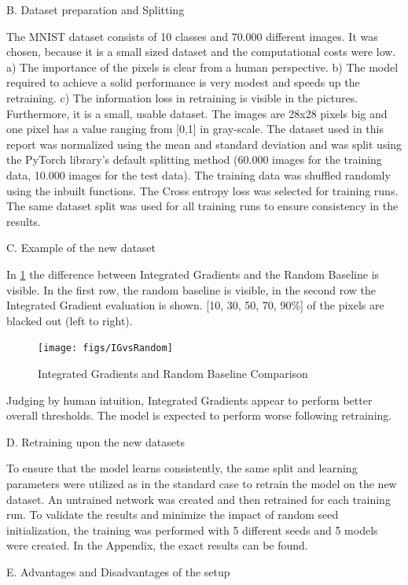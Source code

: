 B. Dataset preparation and Splitting

The MNIST dataset consists of 10 classes and 70.000 different images. It was chosen, because it is a small sized dataset and the computational costs were low. a) The importance of the pixels is clear from a human perspective. b) The model required to achieve a solid performance is very modest and speeds up the retraining. c) The information loss in retraining is visible in the pictures. Furthermore, it is a small, usable   dataset. The images are 28x28 pixels big and one pixel has a value ranging from [0,1] in gray-scale. The dataset used in this report was normalized using the mean and standard deviation and was split using the PyTorch library’s default splitting method (60.000 images for the training data, 10.000 images for the test data). The training data was shuffled randomly using the inbuilt functions. The Cross entropy loss was selected for training runs. The same dataset split was used for all training runs to ensure consistency in the results.

C. Example of the new dataset

In \ref{fig:IGvsRandom} the difference between Integrated Gradients and the Random Baseline is visible. In the first row, the random baseline is visible, in the second row the Integrated Gradient evaluation is shown. [10, 30, 50, 70, 90\%] of the pixels are blacked out (left to right).

\begin{figure}[h!]
	\centering
	\texttt{[image: figs/IGvsRandom]}
	\caption{Integrated Gradients and Random Baseline Comparison}
	\label{fig:IGvsRandom}
\end{figure}

Judging by human intuition, Integrated Gradients appear to perform better overall thresholds. The model is expected to perform worse following retraining.

D. Retraining upon the new datasets

To ensure that the model learns consistently, the same split and learning parameters were utilized as in the standard case to retrain the model on the new dataset. An untrained network was created and then retrained for each training run. To validate the results and minimize the impact of random seed initialization, the training was performed with 5 different seeds and 5 models were created. In the Appendix, the exact results can be found.

E. Advantages and Disadvantages of the setup


